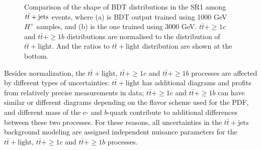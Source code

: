 \begin{description}
    \begin{figure}[H]
      \centering
      \caption{Comparison of the shape of BDT distributions in the SR1 among $t\Bar{t}+\text{jets}$ events, where (a) is BDT output trained using 1000 GeV $H^{+}$ samples, and (b) is the one trained using 3000 GeV. $t\bar{t}+\geq1c$ and $t\bar{t}+\geq1b$ distributions are normalised to the distribution of $t\bar{t}+\text{light}$. And the ratios to $t\bar{t}+\text{light}$ distribution are shown at the bottom.}
      \label{fig:CompTtbarShapeInSR1}
    \end{figure}

    Besides normalization, the $t\bar{t}+\text{light}$, $t\bar{t}+\geq1c$ and $t\bar{t}+\geq1b$ processes are affected by different types of uncertainties: $t\bar{t}+\text{light}$ has additional diagrams and profits from relatively precise measurements in data; $t\bar{t}+\geq1c$ and $t\bar{t}+\geq1b$ can have similar or different diagrams depending on the flavor scheme used for the PDF, and different mass of the $c$- and $b$-quark contribute to additional differences between these two processes. For these reasons, all uncertainties in the $t\bar{t}+\text{jets}$ background modeling are assigned independent nuisance parameters for the $t\bar{t}+\text{light}$, $t\bar{t}+\geq1c$ and $t\bar{t}+\geq1b$ processes.


\end{description}

